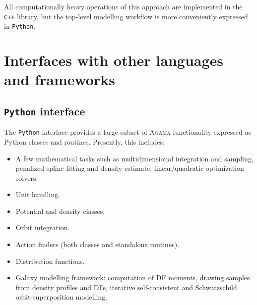 \documentclass[12pt]{article}
\newcommand{\Agama}{\textsc{Agama}\xspace}
\newcommand{\Cpp}  {\texttt{C++}\xspace}
\newcommand{\Python}{\texttt{Python}\xspace}
\begin{document}
All computationally heavy operations of this approach are implemented in the \Cpp library, but the top-level modelling workflow is more conveniently expressed in \Python. 





\section{Interfaces with other languages and frameworks}  \label{sec:Interfaces}

\subsection{\Python interface}  \label{sec:Python}

The \Python interface provides a large subset of \Agama functionality expressed as Python classes and routines. Presently, this includes:
\begin{itemize}  \setlength{\parskip}{2pt} \setlength{\itemsep}{2pt}
\item A few mathematical tasks such as multidimensional integration and sampling, penalized spline fitting and density estimate, linear/quadratic optimization solvers.
\item Unit handling.
\item Potential and density classes.
\item Orbit integration.
\item Action finders (both classes and standalone routines).
\item Distribution functions.
\item Galaxy modelling framework: computation of DF moments, drawing samples from density profiles and DFs, iterative self-consistent and Schwarzschild orbit-superposition modelling.
\end{itemize}
\end{document}
